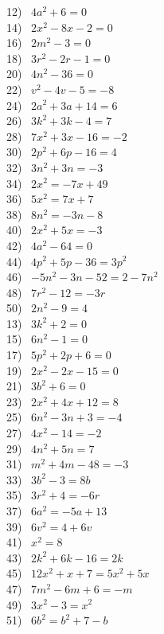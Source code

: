 \begin{multicols}{2}
  12)~ $4 a^2 + 6 = 0$\\
  14)~ $2 x^2 - 8 x - 2 = 0$\\
  16)~ $2 m^2 - 3 = 0$\\
  18)~ $3 r^2 - 2 r - 1 = 0$\\
  20)~ $4 n^2 - 36 = 0$\\
  22)~ $v^2 - 4 v - 5 = - 8$\\
  24)~ $2 a^2 + 3 a + 14 = 6$\\
  26)~ $3 k^2 + 3 k - 4 = 7$\\
  28)~ $7 x^2 + 3 x - 16 = - 2$\\
  30)~ $2 p^2 + 6 p - 16 = 4$\\
  32)~ $3 n^2 + 3 n = - 3$\\
  34)~ $2 x^2 = - 7 x + 49$\\
  36)~ $5 x^2 = 7 x + 7$\\
  38)~ $8 n^2 = - 3 n - 8$\\
  40)~ $2 x^2 + 5 x = - 3$\\
  42)~ $4 a^2 - 64 = 0$\\
  44)~ $4 p^2 + 5 p - 36 = 3 p^2$\\
  46)~ $- 5 n^2 - 3 n - 52 = 2 - 7 n^2$\\
  48)~ $7 r^2 - 12 = - 3 r$\\
  50)~ $2 n^2 - 9 = 4$\\
  13)~ $3 k^2 + 2 = 0$\\
  15)~ $6 n^2 - 1 = 0$\\
  17)~ $5 p^2 + 2 p + 6 = 0$\\
  19)~ $2 x^2 - 2 x - 15 = 0$\\
  21)~ $3 b^2 + 6 = 0$\\
  23)~ $2 x^2 + 4 x + 12 = 8$\\
  25)~ $6 n^2 - 3 n + 3 = - 4$\\
  27)~ $4 x^2 - 14 = - 2$\\
  29)~ $4 n^2 + 5 n = 7$\\
  31)~ $m^2 + 4 m - 48 = - 3$\\
  33)~ $3 b^2 - 3 = 8 b$\\
  35)~ $3 r^2 + 4 = - 6 r$\\
  37)~ $6 a^2 = - 5 a + 13$\\
  39)~ $6 v^2 = 4 + 6 v$\\
  41)~ $x^2 = 8$\\
  43)~ $2 k^2 + 6 k - 16 = 2 k$\\
  45)~ $12 x^2 + x + 7 = 5 x^2 + 5 x$\\
  47)~ $7 m^2 - 6 m + 6 = - m$\\
  49)~ $3 x^2 - 3 = x^2$\\
  51)~ $6 b^2 = b^2 + 7 - b$
\end{multicols}

